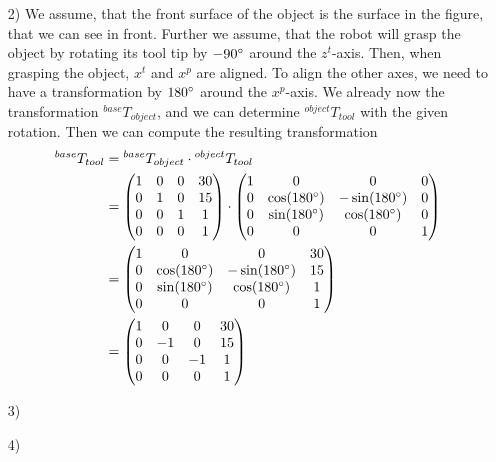 \documentclass[a4paper,11pt]{article}
\begin{document}
\begin {enumerate}
\begin{enumerate}
        \item[2)]
        We assume, that the front surface of the object is the surface in the figure, that we can see in front. Further we assume, that the robot will grasp the object by rotating its tool tip by $-90\degree$ around the $z^t$-axis. Then, when grasping the object, $x^t$ and $x^p$ are aligned. To align the other axes, we need to have a transformation by $180\degree$ around the $x^p$-axis. We already now the transformation ${^{base}T_{object}}$, and we can determine ${^{object}T_{tool}}$ with the given rotation. Then we can compute the resulting transformation
        \begin{align*}
          {^{base}T_{tool}} &= {^{base}T_{object}} \cdot {^{object}T_{tool}}\\
          &= \begin{pmatrix}
            1 & 0 & 0 & 30\\
            0 & 1 & 0 & 15\\
            0 & 0 & 1 & 1\\
            0 & 0 & 0 & 1
          \end{pmatrix} \cdot \begin{pmatrix}
            1 & 0 & 0 & 0\\
            0 & \cos(180\degree) & -\sin(180\degree) & 0\\
            0 & \sin(180\degree) & \cos(180\degree) & 0\\
            0 & 0 & 0 & 1
          \end{pmatrix}\\
          &= \begin{pmatrix}
            1 & 0 & 0 & 30\\
            0 & \cos(180\degree) & -\sin(180\degree) & 15\\
            0 & \sin(180\degree) & \cos(180\degree) & 1\\
            0 & 0 & 0 & 1
          \end{pmatrix}\\
          &= \begin{pmatrix}
            1 & 0 & 0 & 30\\
            0 & -1 & 0 & 15\\
            0 & 0 & -1 & 1\\
            0 & 0 & 0 & 1
          \end{pmatrix}
        \end{align*}

        \item[3)]
        \item[4)]
    \end{enumerate}


\end{enumerate}
\end{document}
